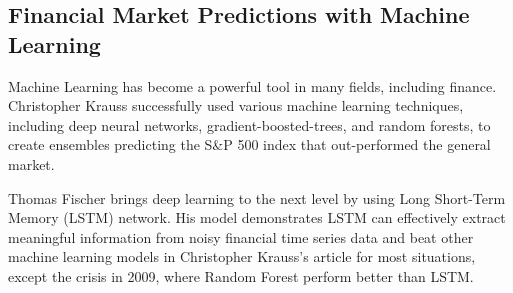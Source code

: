 \subsection{Financial Market Predictions with Machine Learning}
Machine Learning has become a powerful tool in many fields, including finance. Christopher Krauss successfully used various machine learning techniques, including deep neural networks, gradient-boosted-trees, and random forests, to create ensembles predicting the S\&P 500 index that out-performed the general market\cite{KRAUSS2017689}.
\par

Thomas Fischer brings deep learning to the next level by using Long Short-Term Memory (LSTM) network\cite{FISCHER2018654}. His model demonstrates LSTM can effectively extract meaningful information from noisy financial time series data and beat other machine learning models in  Christopher Krauss's article  \cite{KRAUSS2017689} for most situations, except the crisis in 2009, where Random Forest perform better than LSTM.